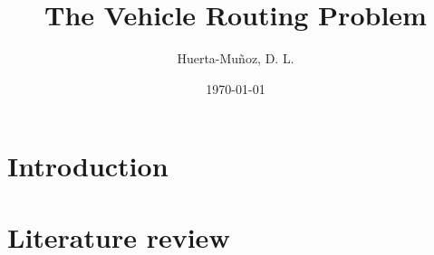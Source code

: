\documentclass{article}
\title{The Vehicle Routing Problem}
\author{Huerta-Muñoz, D. L.}
\date{\today}
\begin{document}
\maketitle

\section{Introduction}

\section{Literature review}
\end{document}
